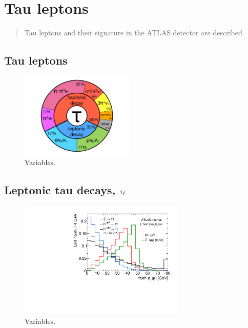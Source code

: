 \chapter[Tau leptons][Tau leptons]{Tau leptons}
\label{chap:taus}

\begin{quote}
  Tau leptons and their signature in the ATLAS detector are described.
\end{quote}

\section{Tau leptons}
\label{sec:taus-theory}

\begin{figure}[tp]
  \centering
  \includegraphics[width=0.48\textwidth]{figures/piecharts/taudecay}
  \caption{Variables.}
  \label{fig:taus-decaypie}
\end{figure}

\section{Leptonic tau decays, $\tau_\ell$}
\label{sec:taus-leptons}

\begin{figure}[tp]
  \centering
  \includegraphics[width=0.7\textwidth]{figures/tauperformance/leptonsfromtausaresoft}
  \caption{Variables.}
  \label{fig:taus-leptonpt}
\end{figure}

